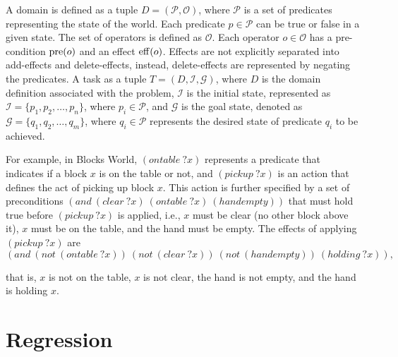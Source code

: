 \documentclass[ppgc,diss,english]{iiufrgs}
\begin{document}
A domain is defined as a tuple $D = (\mathcal{P}, \mathcal{O})$, where $\mathcal{P}$ is a set of predicates representing the state of the world. Each predicate $p \in \mathcal{P}$ can be true or false in a given state. The set of operators is defined as $\mathcal{O}$. Each operator $o \in \mathcal{O}$ has a pre-condition $\operatorname{pre}(o)$ and an effect $\operatorname{eff}(o)$. Effects are not explicitly separated into add-effects and delete-effects, instead, delete-effects are represented by negating the predicates.
A task as a tuple $T = (D, \mathcal{I}, \mathcal{G})$, where $D$ is the domain definition associated with the problem, $\mathcal{I}$ is the initial state, represented as $\mathcal{I} = \{p_1, p_2, \ldots, p_n\}$, where $p_i \in \mathcal{P}$, and $\mathcal{G}$ is the goal state, denoted as $\mathcal{G} = \{q_1, q_2, \ldots, q_m\}$, where $q_i \in \mathcal{P}$ represents the desired state of predicate $q_i$ to be achieved.


For example, in Blocks World, $(ontable~?x)$ represents a predicate that indicates if a block $x$ is on the table or not, and $(pickup~?x)$ is an action that defines the act of picking up block $x$. This action is further specified by a set of preconditions $(and~(clear~?x)~(ontable~?x)~(handempty))$ that must hold true before $(pickup~?x)$ is applied, i.e., $x$ must be clear (no other block above it), $x$ must be on the table, and the hand must be empty. The effects of applying $(pickup~?x)$ are $$(and~(not~(ontable~?x))~(not~(clear~?x))~(not~(handempty))~(holding~?x)),$$

that is, $x$ is not on the table, $x$ is not clear, the hand is not empty, and the hand is holding $x$.

\section{Regression}
\label{background-regression}
\end{document}
